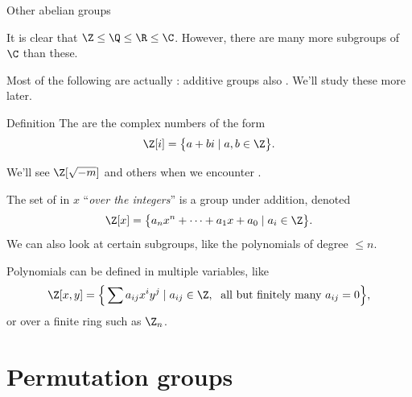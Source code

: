 \documentclass[8pt, handout]{beamer}
\newcommand{\Pause}{}      %
\begin{document}
\begin{frame}{Other abelian groups}
  
  It is clear that $\Z\leq\Q\leq\R\leq\C$. \Pause However, there are
  many more subgroups of $\C$ than these. \medskip\Pause

  Most of the following are actually : additive groups
  also . We'll study
  these more later. \smallskip\pause
  
  \begin{block}{Definition}
  The  are the complex numbers of the form
  \[
  \Z[i]=\big\{a+bi\mid a,b\in\Z\big\}.
  \]
  \end{block}

  \smallskip\Pause
  
  We'll see $\Z[\sqrt{-m}]$ and others when we encounter .  \medskip\pause

  The set of  in $x$ ``\emph{over the integers}'' is a
  group under addition, denoted
  \[
  \Z[x]=\big\{a_nx^n+\cdots+a_1x+a_0\mid a_i\in\Z\big\}.
  \]
  \Pause We can also look at certain subgroups, like the polynomials of degree
  $\leq n$.

  \medskip\pause
  
  Polynomials can be defined in multiple variables, like
  \[
  \Z[x,y]=\Big\{\sum a_{ij}x^iy^j\mid a_{ij}\in\Z,\;\text{ all but
    finitely many $a_{ij}=0$}\Big\},
  \]
  or over a finite ring such as $\Z_n$.
  
\end{frame}

\section{Permutation groups}

\end{document}
